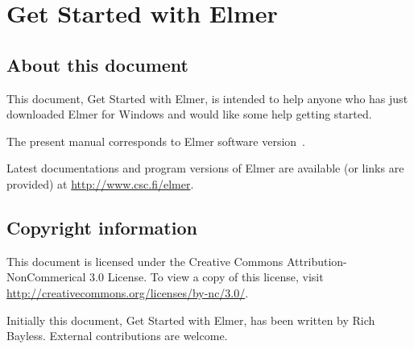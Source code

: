 \chapter*{Get Started with Elmer}

\section*{About this document}

This document, Get Started with Elmer, is intended to help
anyone who has just downloaded Elmer for Windows and would like some
help getting started. 


The present manual corresponds to Elmer software version~\elmerversion{}.

Latest documentations and program versions of Elmer are available (or links are provided) at 
\url{http://www.csc.fi/elmer}. 

\section*{Copyright information}

This document is licensed under the Creative Commons Attribution-NonCommerical 3.0 License. 
To view a copy of this license, visit \url{http://creativecommons.org/licenses/by-nc/3.0/}.

Initially this document, Get Started with Elmer, has been written by Rich Bayless.
External contributions are welcome.



